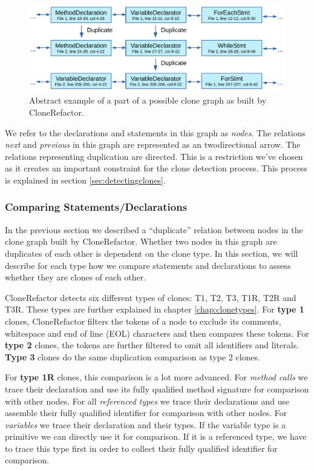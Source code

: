 \begin{figure}[H]
  \centering
  \includegraphics[width=1\columnwidth]{img/CodeGraph2}
  \caption{Abstract example of a part of a possible clone graph as built by CloneRefactor.}
  \label{fig:clonegraphsimple}
\end{figure}

We refer to the declarations and statements in this graph as \textit{nodes}. The relations \textit{next} and \textit{previous} in this graph are represented as an twodirectional arrow. The relations representing duplication are directed. This is a restriction we've chosen as it creates an important constraint for the clone detection process. This process is explained in section \ref{sec:detectingclones}.

\subsubsection{Comparing Statements/Declarations}
In the previous section we described a ``duplicate'' relation between nodes in the clone graph built by CloneRefactor. Whether two nodes in this graph are duplicates of each other is dependent on the clone type. In this section, we will describe for each type how we compare statements and declarations to assess whether they are clones of each other.

CloneRefactor detects six different types of clones: T1, T2, T3, T1R, T2R and T3R. These types are further explained in chapter \ref{chap:clonetypes}. For \textbf{type 1} clones, CloneRefactor filters the tokens of a node to exclude its comments, whitespace and end of line (EOL) characters and then compares these tokens. For \textbf{type 2} clones, the tokens are further filtered to omit all identifiers and literals. \textbf{Type 3} clones do the same duplication comparison as type 2 clones.

For \textbf{type 1R} clones, this comparison is a lot more advanced. For \textit{method calls} we trace their declaration and use its fully qualified method signature for comparison with other nodes. For all \textit{referenced types} we trace their declarations and use assemble their fully qualified identifier for comparison with other nodes. For \textit{variables} we trace their declaration and their types. If the variable type is a primitive we can directly use it for comparison. If it is a referenced type, we have to trace this type first in order to collect their fully qualified identifier for comparison.


